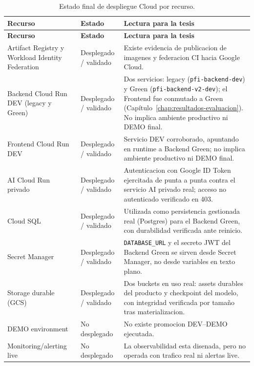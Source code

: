 {\scriptsize
\setlength{\LTleft}{0pt}
\setlength{\LTright}{0pt}
\setlength{\tabcolsep}{3pt}
\renewcommand{\arraystretch}{1.18}
\begin{longtable}{>{\raggedright\arraybackslash}p{} >{\raggedright\arraybackslash}p{} >{\raggedright\arraybackslash}p{}}
\caption{Estado final de despliegue Cloud por recurso.}\label{tab:arch-cloud-estado-final}\\
\hline
\textbf{Recurso} & \textbf{Estado} & \textbf{Lectura para la tesis} \\
\hline
\endfirsthead
\hline
\textbf{Recurso} & \textbf{Estado} & \textbf{Lectura para la tesis} \\
\hline
\endhead
\hline
\endfoot
Artifact Registry y Workload Identity Federation & Desplegado / validado & Existe evidencia de publicacion de imagenes y federacion CI hacia Google Cloud. \\
Backend Cloud Run DEV (legacy y Green) & Desplegado / validado & Dos servicios: legacy (\texttt{pfi-backend-dev}) y Green (\texttt{pfi-backend-v2-dev}); el Frontend fue conmutado a Green (Capítulo~\ref{chap:resultados-evaluacion}). No implica ambiente productivo ni DEMO final. \\
Frontend Cloud Run DEV & Desplegado / validado & Servicio DEV corroborado, apuntando en runtime a Backend Green; no implica ambiente productivo ni DEMO final. \\
AI Cloud Run privado & Desplegado / validado & Autenticacion con Google ID Token ejercitada de punta a punta contra el servicio AI privado real; acceso no autenticado verificado en 403. \\
Cloud SQL & Desplegado / validado & Utilizada como persistencia gestionada real (Postgres) para el Backend Green, con durabilidad verificada ante reinicio. \\
Secret Manager & Desplegado / validado & \texttt{DATABASE\_URL} y el secreto JWT del Backend Green se sirven desde Secret Manager, no desde variables en texto plano. \\
Storage durable (GCS) & Desplegado / validado & Dos buckets en uso real: assets durables del producto y checkpoint del modelo, con integridad verificada por tamaño tras materializacion. \\
DEMO environment & No desplegado & No existe promocion DEV--DEMO ejecutada. \\
Monitoring/alerting live & No desplegado & La observabilidad esta disenada, pero no operada con trafico real ni alertas live. \\
\hline
\end{longtable}
}
